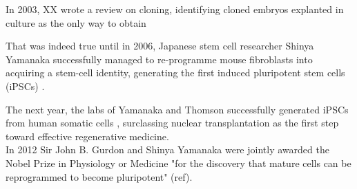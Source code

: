 In 2003, XX wrote a review on cloning, identifying cloned embryos explanted in culture as the only way to obtain 

That was indeed true until in 2006, Japanese stem cell researcher Shinya Yamanaka successfully managed to re-programme mouse fibroblasts into acquiring a stem-cell identity, generating the first induced pluripotent stem cells (iPSCs) \cite{takahashi2006induction}.

The next year, the labs of Yamanaka and Thomson successfully generated iPSCs from human somatic cells \cite{takahashi2006induction, }, surclassing nuclear transplantation as the first step toward effective regenerative medicine.\\

In 2012 Sir John B. Gurdon and Shinya Yamanaka were jointly awarded the Nobel Prize in Physiology or Medicine "for the discovery that mature cells can be reprogrammed to become pluripotent" (ref).    













